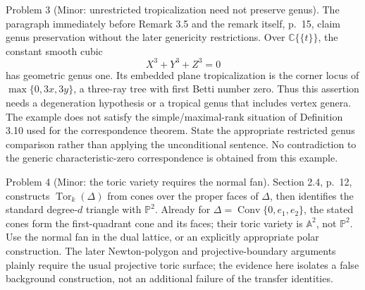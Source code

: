 \documentclass[10pt]{article}
\begin{document}
Problem 3 (Minor: unrestricted tropicalization need not preserve genus).  The paragraph immediately before Remark 3.5 and the remark itself, p. 15, claim genus preservation without the later genericity restrictions. Over \(\mathbb C\{\{t\}\}\), the constant smooth cubic \[X^3+Y^3+Z^3=0\] has geometric genus one. Its embedded plane tropicalization is the corner locus of \(\max\{0,3x,3y\}\), a three-ray tree with first Betti number zero. Thus this assertion needs a degeneration hypothesis or a tropical genus that includes vertex genera. The example does not satisfy the simple/maximal-rank situation of Definition 3.10 used for the correspondence theorem. State the appropriate restricted genus comparison rather than applying the unconditional sentence. No contradiction to the generic characteristic-zero correspondence is obtained from this example.\par
Problem 4 (Minor: the toric variety requires the normal fan).  Section 2.4, p. 12, constructs \(\operatorname{Tor}_k(\Delta)\) from cones over the proper faces of \(\Delta\), then identifies the standard degree-\(d\) triangle with \(\mathbb P^2\). Already for \(\Delta=\operatorname{Conv}\{0,e_1,e_2\}\), the stated cones form the first-quadrant cone and its faces; their toric variety is \(\mathbb A^2\), not \(\mathbb P^2\). Use the normal fan in the dual lattice, or an explicitly appropriate polar construction. The later Newton-polygon and projective-boundary arguments plainly require the usual projective toric surface; the evidence here isolates a false background construction, not an additional failure of the transfer identities.\par
\end{document}

